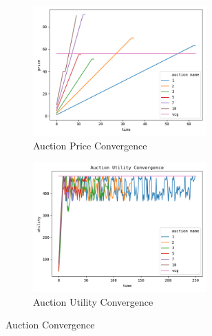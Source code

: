 \documentclass[fleqn]{article}
\begin{document}
\begin{figure}[H]
    \begin{subfigure}{0.5\textwidth}
        \includegraphics[width=1\linewidth, height=5cm]{../results/auction_price_convergence.png}
        \caption{Auction Price Convergence}
    \end{subfigure}
    \begin{subfigure}{0.5\textwidth}
        \includegraphics[width=1\linewidth, height=5cm]{../results/auction_utility_convergence.png}
        \caption{Auction Utility Convergence}
    \end{subfigure}
    \caption{Auction Convergence}
\end{figure}
\end{document}
